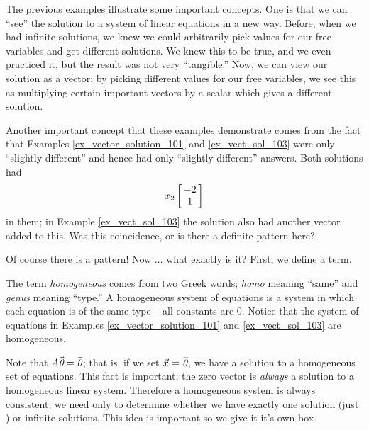 The previous examples illustrate some important concepts. One is that we can ``see'' the solution to a system of linear equations in a new way. Before, when we had infinite solutions, we knew we could arbitrarily pick values for our free variables and get different solutions. We knew this to be true, and we even practiced it, but the result was not very ``tangible.'' Now, we can view our solution as a vector; by picking different values for our free variables, we see this as multiplying certain important vectors by a scalar which gives a different solution.

Another important concept that these examples demonstrate comes from the fact that Examples \ref{ex_vector_solution_101} and \ref{ex_vect_sol_103} were only ``slightly different'' and hence had only ``slightly different'' answers. Both solutions had $$x_2\bmx{c}-2\\1\emx$$ in them; in Example \ref{ex_vect_sol_103} the solution also had another vector added to this. Was this coincidence, or is there a definite pattern here?

Of course there is a pattern! Now $\ldots$ what exactly is it? First, we define a term.


The term \textit{homogeneous} comes from two Greek words; \textit{homo} meaning ``same'' and \textit{genus} meaning ``type.'' A homogeneous system of equations is a system in which each equation is of the same type -- all constants are 0. Notice that the system of equations in Examples \ref{ex_vector_solution_101} and \ref{ex_vect_sol_103} are homogeneous.

Note that $\tta\zero = \zero$; that is, if we set $\vx = \zero$, we have a solution to a homogeneous set of equations. This fact is important; the zero vector is \textit{always} a solution to a homogeneous linear system. Therefore a homogeneous system is always consistent; we need only to determine whether we have exactly one solution (just \zero) or infinite solutions. This idea is important so we give it it's own box.

